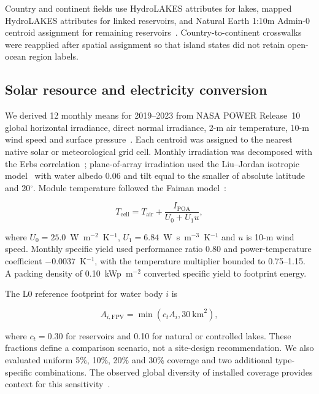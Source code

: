 Country and continent fields use HydroLAKES attributes for lakes, mapped HydroLAKES attributes for linked reservoirs, and Natural Earth 1:10m Admin-0 centroid assignment for remaining reservoirs~\citep{naturalearth2025}. Country-to-continent crosswalks were reapplied after spatial assignment so that island states did not retain open-ocean region labels.

\subsection{Solar resource and electricity conversion}

We derived 12 monthly means for 2019--2023 from NASA POWER Release~10 global horizontal irradiance, direct normal irradiance, 2-m air temperature, 10-m wind speed and surface pressure~\citep{nasaPower2026}. Each centroid was assigned to the nearest native solar or meteorological grid cell. Monthly irradiation was decomposed with the Erbs correlation~\citep{erbs1982}; plane-of-array irradiation used the Liu--Jordan isotropic model~\citep{liu1963} with water albedo 0.06 and tilt equal to the smaller of absolute latitude and 20$^\circ$. Module temperature followed the Faiman model~\citep{faiman2008}:

\begin{equation}
T_{\mathrm{cell}}=T_{\mathrm{air}}+\frac{I_{\mathrm{POA}}}{U_0+U_1u},
\end{equation}

where $U_0=25.0$~W~m$^{-2}$~K$^{-1}$, $U_1=6.84$~W~s~m$^{-3}$~K$^{-1}$ and $u$ is 10-m wind speed. Monthly specific yield used performance ratio 0.80 and power-temperature coefficient $-0.0037$~K$^{-1}$, with the temperature multiplier bounded to 0.75--1.15. A packing density of 0.10~kWp~m$^{-2}$ converted specific yield to footprint energy.

The L0 reference footprint for water body $i$ is

\begin{equation}
A_{i,\mathrm{FPV}}=\min(c_t A_i,30~\mathrm{km}^2),
\end{equation}

where $c_t=0.30$ for reservoirs and 0.10 for natural or controlled lakes. These fractions define a comparison scenario, not a site-design recommendation. We also evaluated uniform 5\%, 10\%, 20\% and 30\% coverage and two additional type-specific combinations. The observed global diversity of installed coverage provides context for this sensitivity~\citep{nobre2024}.

